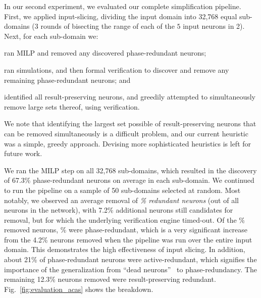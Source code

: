 \documentclass[10pt, conference, twocolumn, compsocconf]{IEEEtran}
\theoremstyle{remark}
\begin{document}
In our second experiment, we evaluated our complete simplification
pipeline. First, we applied input-slicing, dividing the input domain
into 32,768 equal sub-domains (3 rounds of bisecting the range of each
of the $5$ input neurons in 2). Next, for each sub-domain we:
\begin{inparaenum}[(i)]
\item ran MILP and removed any discovered phase-redundant neurons;
\item ran simulations, and then formal verification to discover and
  remove any remaining phase-redundant neurons; and
\item identified all result-preserving neurons, and greedily attempted to
  simultaneously remove large sets thereof, using verification.
\end{inparaenum}
We note that identifying the largest set possible of result-preserving neurons that
can be removed simultaneously is a difficult problem, and our current
heuristic was a simple, greedy approach. Devising more sophisticated
heuristics is left for future work.


\newcommand{\statsMilp}{68.5}
\newcommand{\statsNonRedBySim}{26.4}
\newcommand{\statsRedByFormal}{1.7}
\newcommand{\statsResPres}{12.3}
\newcommand{\statsUnknowns}{7.2}
\newcommand{\statsTotalRed}{\fpeval{\statsMilp+\statsRedByFormal+\statsResPres}}

We ran the MILP step on all 32,768 sub-domains, which resulted in the
discovery of 67.3\%
phase-redundant neurons on average in each sub-domain.
We continued to run the pipeline on a
sample of 50 sub-domains selected at random.
Most notably, we observed an average removal of \emph{
  \statsTotalRed\% redundant neurons} (out of all neurons in the
network), with \statsUnknowns\% additional neurons still candidates
for removal, but for which the underlying verification engine
timed-out. Of the \statsTotalRed\% removed neurons, \fpeval{\statsMilp + \statsRedByFormal}\% were
phase-redundant, which is a very significant increase from the 4.2\% neurons
removed when the pipeline was run over the entire input domain. This
demonstrates the high effectiveness of input slicing. In addition,
about 21\% of phase-redundant neurons were active-redundant, which
signifies the importance of the generalization from ``dead neurons''~\cite{GoFeMaBaKa20} to
phase-redundancy. The remaining
\statsResPres\% neurons removed were result-preserving redundant.
Fig.~\ref{fig:evaluation_acas} shows the breakdown.
\end{document}
